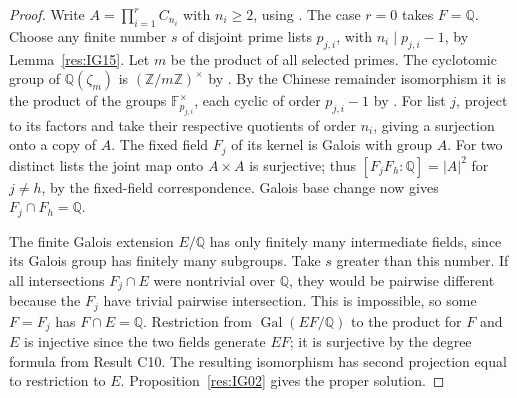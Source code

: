 \documentclass[11pt,oneside,openany]{book}
\theoremstyle{definition}
\theoremstyle{remark}
\begin{document}
\begin{proof}
Write \(A=\prod_{i=1}^r C_{n_i}\) with \(n_i\geq2\),
using \cite[Result K07.07.invariant\_factor\_existence]{mg-d07}.
The case \(r=0\) takes \(F=\mathbb Q\). Choose any finite
number \(s\) of disjoint prime lists \(p_{j,i}\), with
\(n_i\mid p_{j,i}-1\), by Lemma~\ref{res:IG15}.
Let \(m\) be the product of all selected primes. The cyclotomic
group of \(\mathbb Q(\zeta_m)\) is
\((\mathbb Z/m\mathbb Z)^\times\) by
\cite[Result K07.15.cyclotomic\_galois]{mg-d07}.
By the Chinese remainder isomorphism it is the product of
the groups \(\mathbb F_{p_{j,i}}^\times\), each cyclic of
order \(p_{j,i}-1\) by
\cite[Result K07.13.multiplicative\_cyclic]{mg-d07}.
For list \(j\), project to its factors and take their respective
quotients of order \(n_i\), giving a surjection onto a copy
of \(A\). The fixed field \(F_j\) of its kernel is Galois
with group \(A\). For two distinct lists the joint map onto
\(A\times A\) is surjective; thus
\([F_jF_h:\mathbb Q]=|A|^2\) for \(j\ne h\), by the
fixed-field correspondence. Galois base change
\cite[Result C10]{mg-aft} now gives \(F_j\cap F_h=\mathbb Q\).

The finite Galois extension \(E/\mathbb Q\) has only finitely
many intermediate fields, since its Galois group has finitely
many subgroups. Take \(s\) greater than this number. If all
intersections \(F_j\cap E\) were nontrivial over \(\mathbb Q\),
they would be pairwise different because the \(F_j\) have
trivial pairwise intersection. This is impossible, so some
\(F=F_j\) has \(F\cap E=\mathbb Q\). Restriction from
\(\operatorname{Gal}(EF/\mathbb Q)\) to the product for \(F\)
and \(E\) is injective since the two fields generate \(EF\);
it is surjective by the degree formula from Result C10.
The resulting isomorphism has second projection equal to
restriction to \(E\). Proposition~\ref{res:IG02} gives the
proper solution.
\end{proof}
\backmatter
\begingroup
\small
\end{document}
